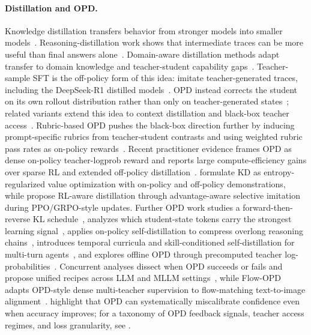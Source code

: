 \documentclass{article}
\begin{document}
\paragraph{Distillation and OPD.} Knowledge distillation transfers behavior from stronger models into smaller models~\citep{hinton2015distilling}. Reasoning-distillation work shows that intermediate traces can be more useful than final answers alone~\citep{fu2023specializing,li2022explanations,magister2023teaching,hsieh2023distilling}. Domain-aware distillation methods adapt transfer to domain knowledge and teacher-student capability gaps~\citep{liu2024ddk}. Teacher-sample SFT is the off-policy form of this idea: imitate teacher-generated traces, including the DeepSeek-R1 distilled models~\citep{deepseek2025r1}. OPD instead corrects the student on its own rollout distribution rather than only on teacher-generated states~\citep{agarwal2024onpolicy}; related variants extend this idea to context distillation and black-box teacher access~\citep{ye2026opcd,ye2026blackboxopd}. Rubric-based OPD pushes the black-box direction further by inducing prompt-specific rubrics from teacher-student contrasts and using weighted rubric pass rates as on-policy rewards~\citep{fang2026rubricopd}. Recent practitioner evidence frames OPD as dense on-policy teacher-logprob reward and reports large compute-efficiency gains over sparse RL and extended off-policy distillation~\citep{lu2025onpolicydistillation}. \citet{liu2025trainingwheels} formulate KD as entropy-regularized value optimization with on-policy and off-policy demonstrations, while \citet{zhang2026reinforcementaware} propose RL-aware distillation through advantage-aware selective imitation during PPO/GRPO-style updates. Further OPD work studies a forward-then-reverse KL schedule~\citep{xu2026paced}, analyzes which student-state tokens carry the strongest learning signal~\citep{xu2026tip}, applies on-policy self-distillation to compress overlong reasoning chains~\citep{sang2026crisp}, introduces temporal curricula and skill-conditioned self-distillation for multi-turn agents~\citep{wang2026tcod,wang2026skillsd}, and explores offline OPD through precomputed teacher log-probabilities~\citep{wu2026lightningopd}. Concurrent analyses dissect when OPD succeeds or fails and propose unified recipes across LLM and MLLM settings~\citep{li2026rethinkopd,hou2026uniopd}, while Flow-OPD adapts OPD-style dense multi-teacher supervision to flow-matching text-to-image alignment~\citep{fang2026flowopd}. \citet{zhang2026caopd} highlight that OPD can systematically miscalibrate confidence even when accuracy improves; for a taxonomy of OPD feedback signals, teacher access regimes, and loss granularity, see \citet{song2026opdsurvey}.
\end{document}
